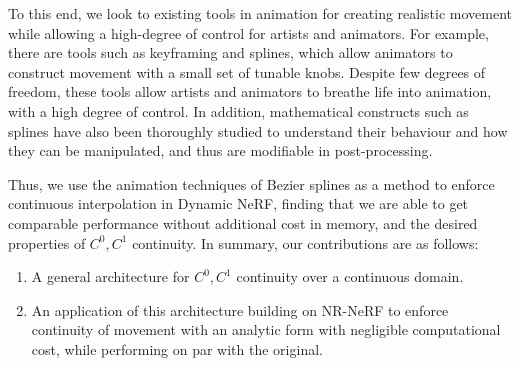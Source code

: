 To this end, we look to existing tools in animation for creating realistic movement while allowing a high-degree of control for artists and animators. For example, there are tools such as keyframing and splines, which allow animators to construct movement with a small set of tunable knobs. Despite few degrees of freedom, these tools allow artists and animators to breathe life into animation, with a high degree of control. In addition, mathematical constructs such as splines have also been thoroughly studied to understand their behaviour and how they can be manipulated, and thus are modifiable in post-processing.

Thus, we use the animation techniques of Bezier splines as a method to enforce continuous interpolation in Dynamic NeRF, finding that we are able to get comparable performance without additional cost in memory, and the desired properties of $C^0, C^1$ continuity.
In summary, our contributions are as follows:

\begin{enumerate}
    \item A general architecture for $C^0, C^1$ continuity over a continuous domain.
    \item An application of this architecture building on NR-NeRF to enforce continuity of movement with an analytic form with negligible computational cost, while performing on par with the original.
\end{enumerate}

